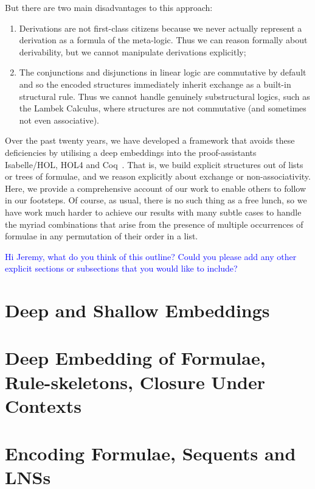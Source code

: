 \documentclass[a4paper]{article}
\newcommand{\raj}[1]{\textcolor{blue}{#1}}
\begin{document}
But there are two main disadvantages to this approach:
\begin{enumerate}
\item Derivations are not first-class citizens because we never actually represent a derivation as a formula of the meta-logic.
  Thus we can reason formally about derivability, but we cannot manipulate derivations explicitly;
\item The conjunctions and disjunctions in linear logic are commutative by default and so the encoded structures immediately
  inherit exchange as a built-in structural rule. Thus we cannot handle genuinely substructural logics,
  such as the Lambek Calculus, where
  structures are not commutative (and sometimes not even associative).
\end{enumerate}

Over the past twenty years, we have developed a framework that avoids these deficiencies by utilising a deep embeddings into the
proof-assistants Isabelle/HOL, HOL4 and Coq~\cite{dawson-gore-generalised,dawson-gore-dual-tableaux,dawson-gore-display}.  That
is, we build explicit structures out of lists or trees of formulae, and we reason explicitly about exchange or
non-associativity. Here, we provide a comprehensive account of our work to enable others to follow in our footsteps.  Of course,
as usual, there is no such thing as a free lunch, so we have work much harder to achieve our results with many subtle cases to
handle the myriad combinations that arise from the presence of multiple occurrences of formulae in any permutation of their order
in a list.

\raj{Hi Jeremy, what do you think of this outline? Could you please add any other explicit sections or subsections that you would like to include?}

\section{Deep and Shallow Embeddings}

\section{Deep Embedding of Formulae, Rule-skeletons, Closure Under Contexts}

\section{Encoding Formulae, Sequents and LNSs}
\end{document}

